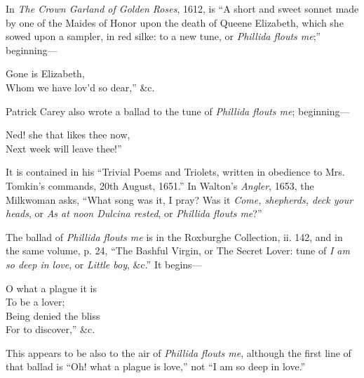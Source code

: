 

\vspace{-2\baselineskip}


In \textit{The Crown Garland of Golden Roses}, 1612, is “A short and sweet sonnet
made by one of the Maides of Honor upon the death of Queene Elizabeth, which
she sowed upon a sampler, in red silke: to a new tune, or \textit{Phillida flouts me};”
beginning—
\settowidth{\versewidth}{Whom we have lov’d so dear,” }
\begin{scverse}
Gone is Elizabeth,\\
Whom we have lov’d so dear,” \&c.
\end{scverse}

\pagebreak

Patrick Carey also wrote a ballad to the tune of \textit{Phillida flouts me}; beginning—
\settowidth{\versewidth}{Ned! she that likes thee now,}
\begin{scverse}
Ned! she that likes thee now,\\
Next week will leave thee!”
\end{scverse}
It is contained in his “Trivial Poems and Triolets, written in obedience to
Mrs. Tomkin’s commands, 20th August, 1651.” In Walton’s \textit{Angler}, 1653, the
Milkwoman asks, “What song was it, I pray? Was it \textit{Come, shepherds, deck
your heads}, or \textit{As at noon Dulcina rested}, or \textit{Phillida flouts me}?”

The ballad of \textit{Phillida flouts me} is in the Roxburghe Collection, ii. 142, and in
the same volume, p. 24, “The Bashful Virgin, or The Secret Lover: tune of
\textit{I am so deep in love}, or \textit{Little boy}, \&c.” It begins—
\settowidth{\versewidth}{O what a plague it is}
\begin{scverse}
\begin{altverse}
O what a plague it is\\
To be a lover;\\
Being denied the bliss\\
For to discover,” \&c.
\end{altverse}
\end{scverse}

This appears to be also to the air of \textit{Phillida flouts me}, although the first line of
that ballad is “Oh! what a plague is love,” not “I am so deep in love.”

